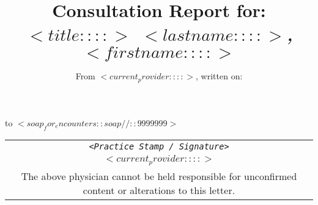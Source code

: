 \documentclass[10pt,english]{article}
\begin{document}


\title {Consultation Report for: \\ \emph {$<title::::>$ $<lastname::::>$, $<firstname::::>$}}
\author {From $<current_provider::::>$, written on:}
\maketitle 


\noindent
\begin{longtabu} to \textwidth {lX[,L]}
\endfoot
\endlastfoot
$<soap_for_encounters::soap//::9999999>$
\end{longtabu}


\begin{tabular}{c}
\rule{0pt}{10ex} \texttt {\textsl {\footnotesize <Practice Stamp / Signature>}}\\
\rule{0pt}{4ex} {\footnotesize $<current_provider::::>$}\\
\hline
\tiny The above physician cannot be held responsible for unconfirmed content or alterations to this letter. \\
\end{tabular}
\end{document}
